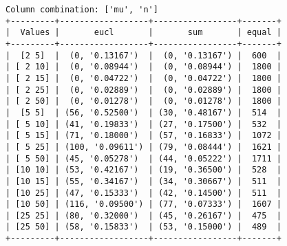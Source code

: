 \documentclass{article}
\begin{document}
\begin{verbatim}
Column combination: ['mu', 'n']
+---------+------------------+-----------------+-------+
|  Values |       eucl       |       sum       | equal |
+---------+------------------+-----------------+-------+
|  [2 5]  |  (0, '0.13167')  |  (0, '0.13167') |  600  |
| [ 2 10] |  (0, '0.08944')  |  (0, '0.08944') |  1800 |
| [ 2 15] |  (0, '0.04722')  |  (0, '0.04722') |  1800 |
| [ 2 25] |  (0, '0.02889')  |  (0, '0.02889') |  1800 |
| [ 2 50] |  (0, '0.01278')  |  (0, '0.01278') |  1800 |
|  [5 5]  | (56, '0.52500')  | (30, '0.48167') |  514  |
| [ 5 10] | (41, '0.19833')  | (27, '0.17500') |  532  |
| [ 5 15] | (71, '0.18000')  | (57, '0.16833') |  1072 |
| [ 5 25] | (100, '0.09611') | (79, '0.08444') |  1621 |
| [ 5 50] | (45, '0.05278')  | (44, '0.05222') |  1711 |
| [10 10] | (53, '0.42167')  | (19, '0.36500') |  528  |
| [10 15] | (55, '0.34167')  | (34, '0.30667') |  511  |
| [10 25] | (47, '0.15333')  | (42, '0.14500') |  511  |
| [10 50] | (116, '0.09500') | (77, '0.07333') |  1607 |
| [25 25] | (80, '0.32000')  | (45, '0.26167') |  475  |
| [25 50] | (58, '0.15833')  | (53, '0.15000') |  489  |
+---------+------------------+-----------------+-------+
\end{verbatim}
\end{document}
